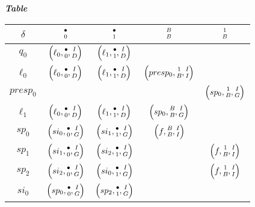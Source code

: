 \begin{center}
	\emph{\bfseries Table }
	
	\smallskip
	\begin{tabular}{|c||c|c|c|c|}
		\hline
		$\delta$ 
			& $\twocoord{\bullet}{0}$ 
			& $\twocoord{\bullet}{1}$
			& $\twocoord{B}{B}$       
			& $\twocoord{1}{B}$       \\
		\hline
		\hline
		$q_0$ 
			& $\left( \ell_0 , \twocoord{\bullet}{0} , \twocoord{I}{D} \right)$ 
			& $\left( \ell_1 , \twocoord{\bullet}{1} , \twocoord{I}{D} \right)$
			&                   
			&                                                                   \\
		\hline
		$\ell_0$
			& $\left( \ell_0  , \twocoord{\bullet}{0} , \twocoord{I}{D} \right)$ 
			& $\left( \ell_1  , \twocoord{\bullet}{1} , \twocoord{I}{D} \right)$
			& $\left( presp_0 , \twocoord{1}{B}       , \twocoord{I}{I} \right)$
			&                                                                    \\
		\hline
		$presp_0$
			&  
			&  
			& 
			& $\left( sp_0 , \twocoord{1}{B} , \twocoord{I}{G} \right)$ \\
		\hline
		$\ell_1$
			& $\left( \ell_0 , \twocoord{\bullet}{0} , \twocoord{I}{D} \right)$ 
			& $\left( \ell_1 , \twocoord{\bullet}{1} , \twocoord{I}{D} \right)$
			& $\left( sp_0   , \twocoord{B}{B}       , \twocoord{I}{G} \right)$
			&                                                                   \\
		\hline
		\hline
		$sp_0$ 
			& $\left(si_0 , \twocoord{\bullet}{0} , \twocoord{I}{G} \right)$ 
			& $\left(si_1 , \twocoord{\bullet}{1} , \twocoord{I}{G} \right)$
			& $\left(f    , \twocoord{B}{B}       , \twocoord{I}{I} \right)$
			&                                                                \\
		\hline
		$sp_1$ 
			& $\left(si_1 , \twocoord{\bullet}{0} , \twocoord{I}{G} \right)$ 
			& $\left(si_2 , \twocoord{\bullet}{1} , \twocoord{I}{G} \right)$
			&
			& $\left(f    , \twocoord{1}{B}       , \twocoord{I}{I} \right)$ \\
		\hline
		$sp_2$ 
			& $\left(si_2 , \twocoord{\bullet}{0} , \twocoord{I}{G} \right)$ 
			& $\left(si_0 , \twocoord{\bullet}{1} , \twocoord{I}{G} \right)$
			&
			& $\left(f    , \twocoord{1}{B}       , \twocoord{I}{I} \right)$ \\
		\hline
		\hline
		$si_0$ 
			& $\left(sp_0 , \twocoord{\bullet}{0} , \twocoord{I}{G} \right)$ 
			& $\left(sp_2 , \twocoord{\bullet}{1} , \twocoord{I}{G} \right)$

\end{tabular}
\end{center}
